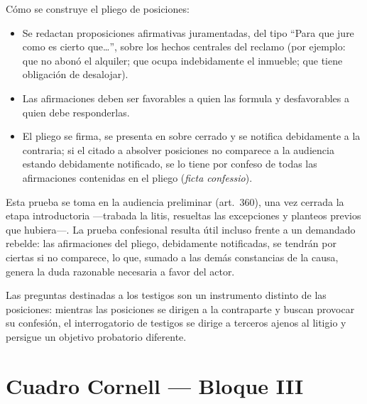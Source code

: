 \documentclass[12pt,oneside]{book}
\begin{document}
\begin{important}
Cómo se construye el pliego de posiciones:
\begin{itemize}
    \item Se redactan proposiciones afirmativas juramentadas, del tipo ``Para que jure como es cierto que\dots'', sobre los hechos centrales del reclamo (por ejemplo: que no abonó el alquiler; que ocupa indebidamente el inmueble; que tiene obligación de desalojar).
    \item Las afirmaciones deben ser favorables a quien las formula y desfavorables a quien debe responderlas.
    \item El pliego se firma, se presenta en sobre cerrado y se notifica debidamente a la contraria; si el citado a absolver posiciones no comparece a la audiencia estando debidamente notificado, se lo tiene por confeso de todas las afirmaciones contenidas en el pliego (\textit{ficta confessio}).
\end{itemize}
\end{important}

Esta prueba se toma en la audiencia preliminar (art.\ 360), una vez cerrada la etapa introductoria —trabada la litis, resueltas las excepciones y planteos previos que hubiera—. La prueba confesional resulta útil incluso frente a un demandado rebelde: las afirmaciones del pliego, debidamente notificadas, se tendrán por ciertas si no comparece, lo que, sumado a las demás constancias de la causa, genera la duda razonable necesaria a favor del actor.

\begin{note}
Las preguntas destinadas a los testigos son un instrumento distinto de las posiciones: mientras las posiciones se dirigen a la contraparte y buscan provocar su confesión, el interrogatorio de testigos se dirige a terceros ajenos al litigio y persigue un objetivo probatorio diferente.
\end{note}

\section*{Cuadro Cornell — Bloque III}
\end{document}
